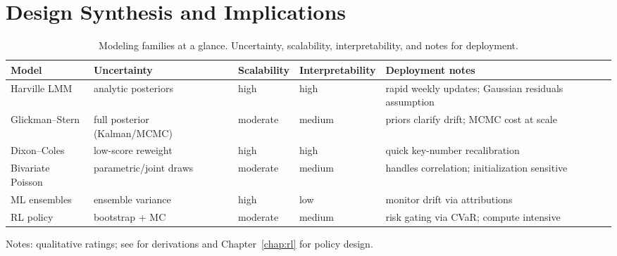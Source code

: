 \section{Design Synthesis and Implications}
\label{sec:synth}

\begin{table}[p]
  \vspace*{\fill}
  \centering
  \begin{adjustwidth}{-0.35in}{-0.35in}
  \begin{threeparttable}
  \captionsetup{justification=centering}
  \caption[Modeling families at a glance]{Modeling families at a glance. Uncertainty, scalability, interpretability, and notes for deployment.}
  \label{tab:model-compare}
  \begingroup
   \footnotesize
   \setlength{\tabcolsep}{4pt}%
   \renewcommand{\arraystretch}{1.18}%
   \setlength{\aboverulesep}{0.6ex}%
   \setlength{\belowrulesep}{0.5ex}%
   \begin{tabularx}{\linewidth}{@{} l Y Y Y Y @{} }
     \toprule[1.2pt]
     \textbf{Model} & \textbf{Uncertainty} & \textbf{Scalability} & \textbf{Interpretability} & \textbf{Deployment notes} \\
     \midrule
     Harville LMM & analytic posteriors & high & high & rapid weekly updates; Gaussian residuals assumption \\
     Glickman--Stern & full posterior (Kalman/MCMC) & moderate & medium & priors clarify drift; MCMC cost at scale \\
     Dixon--Coles & low-score reweight & high & high & quick key-number recalibration \\
     Bivariate Poisson & parametric/joint draws & moderate & medium & handles correlation; initialization sensitive \\
     ML ensembles & ensemble variance & high & low & monitor drift via attributions \\
     RL policy & bootstrap + MC & moderate & medium & risk gating via CVaR; compute intensive \\
     \bottomrule[1.2pt]
   \end{tabularx}
  \endgroup
  \begin{tablenotes}[flushleft]\footnotesize
    \item Notes: qualitative ratings; see  for derivations and Chapter~\ref{chap:rl} for policy design.
  \end{tablenotes}
  \end{threeparttable}
  \end{adjustwidth}
  \vspace*{\fill}
\end{table}

